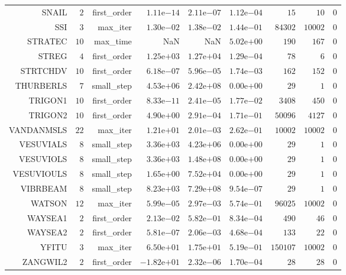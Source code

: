 \begin{longtable}{rrrrrrrrr}
SNAIL & \(     2\) & first\_order & \( 1.11\)e\(-14\) & \( 2.11\)e\(-07\) & \( 1.12\)e\(-04\) & \(    15\) & \(    10\) & \(     0\) \\
SSI & \(     3\) & max\_iter & \( 1.30\)e\(-02\) & \( 1.38\)e\(-02\) & \( 1.44\)e\(-01\) & \( 84302\) & \( 10002\) & \(     0\) \\
STRATEC & \(    10\) & max\_time &       NaN &       NaN & \( 5.02\)e\(+00\) & \(   190\) & \(   167\) & \(     0\) \\
STREG & \(     4\) & first\_order & \( 1.25\)e\(+03\) & \( 1.27\)e\(+04\) & \( 1.29\)e\(-04\) & \(    78\) & \(     6\) & \(     0\) \\
STRTCHDV & \(    10\) & first\_order & \( 6.18\)e\(-07\) & \( 5.96\)e\(-05\) & \( 1.74\)e\(-03\) & \(   162\) & \(   152\) & \(     0\) \\
THURBERLS & \(     7\) & small\_step & \( 4.53\)e\(+06\) & \( 2.42\)e\(+08\) & \( 0.00\)e\(+00\) & \(    29\) & \(     1\) & \(     0\) \\
TRIGON1 & \(    10\) & first\_order & \( 8.33\)e\(-11\) & \( 2.41\)e\(-05\) & \( 1.77\)e\(-02\) & \(  3408\) & \(   450\) & \(     0\) \\
TRIGON2 & \(    10\) & first\_order & \( 4.90\)e\(+00\) & \( 2.91\)e\(-04\) & \( 1.71\)e\(-01\) & \( 50096\) & \(  4127\) & \(     0\) \\
VANDANMSLS & \(    22\) & max\_iter & \( 1.21\)e\(+01\) & \( 2.01\)e\(-03\) & \( 2.62\)e\(-01\) & \( 10002\) & \( 10002\) & \(     0\) \\
VESUVIALS & \(     8\) & small\_step & \( 3.36\)e\(+03\) & \( 4.23\)e\(+06\) & \( 0.00\)e\(+00\) & \(    29\) & \(     1\) & \(     0\) \\
VESUVIOLS & \(     8\) & small\_step & \( 3.36\)e\(+03\) & \( 1.48\)e\(+08\) & \( 0.00\)e\(+00\) & \(    29\) & \(     1\) & \(     0\) \\
VESUVIOULS & \(     8\) & small\_step & \( 1.65\)e\(+00\) & \( 7.52\)e\(+04\) & \( 0.00\)e\(+00\) & \(    29\) & \(     1\) & \(     0\) \\
VIBRBEAM & \(     8\) & small\_step & \( 8.23\)e\(+03\) & \( 7.29\)e\(+08\) & \( 9.54\)e\(-07\) & \(    29\) & \(     1\) & \(     0\) \\
WATSON & \(    12\) & max\_iter & \( 5.99\)e\(-05\) & \( 2.97\)e\(-03\) & \( 5.74\)e\(-01\) & \( 96025\) & \( 10002\) & \(     0\) \\
WAYSEA1 & \(     2\) & first\_order & \( 2.13\)e\(-02\) & \( 5.82\)e\(-01\) & \( 8.34\)e\(-04\) & \(   490\) & \(    46\) & \(     0\) \\
WAYSEA2 & \(     2\) & first\_order & \( 5.81\)e\(-07\) & \( 2.06\)e\(-03\) & \( 4.68\)e\(-04\) & \(   133\) & \(    22\) & \(     0\) \\
YFITU & \(     3\) & max\_iter & \( 6.50\)e\(+01\) & \( 1.75\)e\(+01\) & \( 5.19\)e\(-01\) & \(150107\) & \( 10002\) & \(     0\) \\
ZANGWIL2 & \(     2\) & first\_order & \(-1.82\)e\(+01\) & \( 2.32\)e\(-06\) & \( 1.70\)e\(-04\) & \(    28\) & \(    28\) & \(     0\) \\\hline
\end{longtable}
